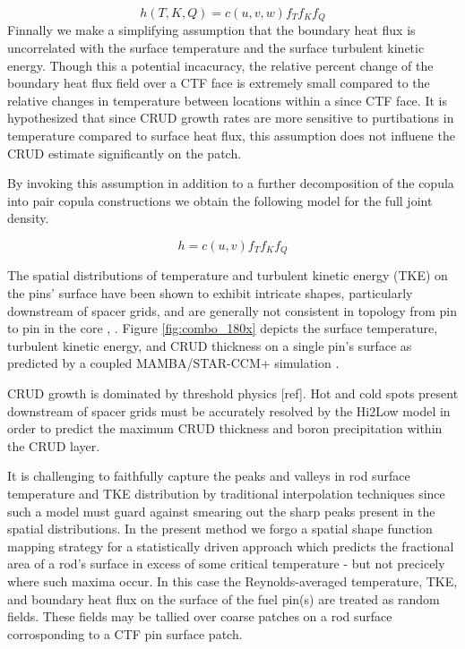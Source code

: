 \documentclass{anstrans}
\begin{document}
\begin{equation}
h(T, K, Q)= c(u, v, w)f_T f_K f_Q
\end{equation}
Finnally we make a simplifying assumption that the boundary heat flux is uncorrelated with the surface temperature and the surface turbulent kinetic energy.  Though this a potential incacuracy, the relative percent change of the boundary heat flux field over a CTF face is extremely small compared to the relative changes in temperature between locations within a since CTF face.  It is hypothesized that since CRUD growth rates are more sensitive to purtibations in temperature compared to surface heat flux, this assumption does not influene the CRUD estimate significantly on the patch.

By invoking this assumption in addition to a further decomposition of the copula into pair copula constructions we obtain the following model for the full joint density.

\begin{equation}
h = c(u,v) f_T f_K f_Q 
\end{equation}


The spatial distributions of temperature and turbulent kinetic energy (TKE) on the pins'
surface have been shown to exhibit intricate shapes, particularly downstream of
spacer grids, and are generally not consistent in topology from pin to pin in the
core \cite{manera16}, \cite{walter16}.  Figure \ref{fig:combo_180x} depicts
the surface temperature, turbulent kinetic energy, and CRUD thickness on a single
pin's surface as predicted by a coupled MAMBA/STAR-CCM+ simulation \cite{slattery16}.



CRUD growth is dominated by threshold physics [ref].  Hot and cold spots
present downstream of spacer grids must be accurately resolved by the Hi2Low model
in order to predict the maximum CRUD
thickness and boron precipitation within the CRUD layer.  

It is challenging to faithfully capture the peaks and valleys in
rod surface temperature and TKE distribution by traditional interpolation
techniques since such a model must guard against smearing out the sharp peaks
present in the spatial distributions.  
In the present method we forgo a spatial shape function mapping strategy
for a statistically driven approach which predicts the fractional
area of a rod's surface in excess of some critical temperature - but not
precicely where such maxima occur.
In this case the Reynolds-averaged temperature,
TKE, and boundary heat flux on the surface of the fuel pin(s) are treated
as random fields.  These fields may be tallied over coarse patches on a rod surface corrosponding
to a CTF pin surface patch.
\end{document}
